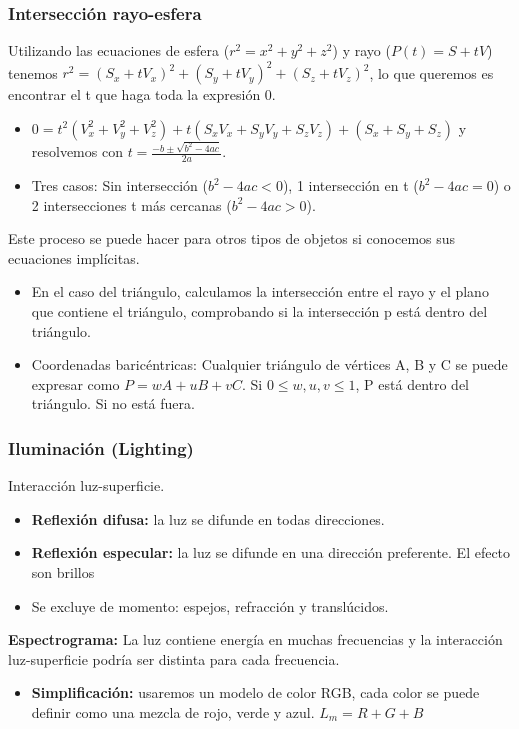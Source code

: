 \subsubsection{Intersección rayo-esfera} 
Utilizando las ecuaciones de esfera ($r^2=x^2+y^2+z^2$) y rayo ($P(t)=S+tV$) tenemos $r^2=(S_x+tV_x)^2+(S_y+tV_y)^2+(S_z+tV_z)^2$, lo que queremos es encontrar el t que haga toda la expresión 0.
\begin{itemize}
    \item $0=t^2(V_x^2+V_y^2+V_z^2)+t(S_xV_x+S_yV_y+S_zV_z)+(S_x+S_y+S_z)$ y resolvemos con $t=\frac{-b \pm \sqrt{b^2-4ac}}{2a}$.
    \item Tres casos: Sin intersección ($b^2-4ac <0$), 1 intersección en t ($b^2-4ac =0$) o 2 intersecciones t más cercanas ($b^2-4ac >0$).
\end{itemize}

Este proceso se puede hacer para otros tipos de objetos si conocemos sus ecuaciones implícitas.
\begin{itemize}
    \item En el caso del triángulo, calculamos la intersección entre el rayo y el plano que contiene el triángulo, comprobando si la intersección p está dentro del triángulo.
    \item Coordenadas baricéntricas: Cualquier triángulo de vértices A, B y C se puede expresar como $P=wA+uB+vC$. Si $0\leq w, u, v \leq 1$, P está dentro del triángulo. Si no está fuera.
\end{itemize}

\subsubsection{Iluminación (Lighting)} 
Interacción luz-superficie.
\begin{itemize}
    \item \textbf{Reflexión difusa:} la luz se difunde en todas direcciones.
    \item \textbf{Reflexión especular:} la luz se difunde en una dirección preferente. El efecto son brillos
    \item Se excluye de momento: espejos, refracción y translúcidos.
\end{itemize}

\textbf{Espectrograma:} La luz contiene energía en muchas frecuencias y la interacción luz-superficie podría ser distinta para cada frecuencia. 
\begin{itemize}
    \item \textbf{Simplificación:} usaremos un modelo de color RGB, cada color se puede definir como una mezcla de rojo, verde y azul. $L_m=R+G+B$
\end{itemize} 

